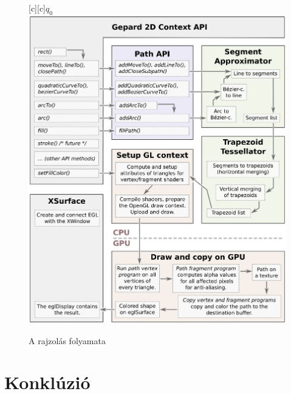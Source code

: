 \documentclass[12pt]{report}
\theoremstyle{definition}
\begin{document}
    \begin{figure}[h]
    \centering
    [c][c]{$q_0$}
    \includegraphics[scale=0.6]{dataflow.eps}
    \caption{\label{dataflow-diagram} A rajzolás folyamata}
    \end{figure}



    \chapter{Konklúzió}



    {}
    
\end{document}
